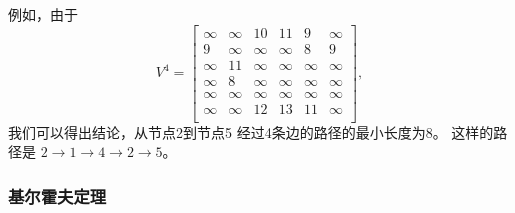 例如，由于
\[
V^4= \begin{bmatrix}
  \infty & \infty & 10 & 11 & 9 & \infty \\
  9 & \infty & \infty & \infty & 8 & 9 \\
  \infty & 11 & \infty & \infty & \infty & \infty \\
  \infty & 8 & \infty & \infty & \infty & \infty \\
  \infty & \infty & \infty & \infty & \infty & \infty \\
  \infty & \infty & 12 & 13 & 11 & \infty \\
 \end{bmatrix},
\]
我们可以得出结论，从节点2到节点5
经过4条边的路径的最小长度为8。
这样的路径是
$2 \rightarrow 1 \rightarrow 4 \rightarrow 2 \rightarrow 5$。

\subsubsection{基尔霍夫定理}


